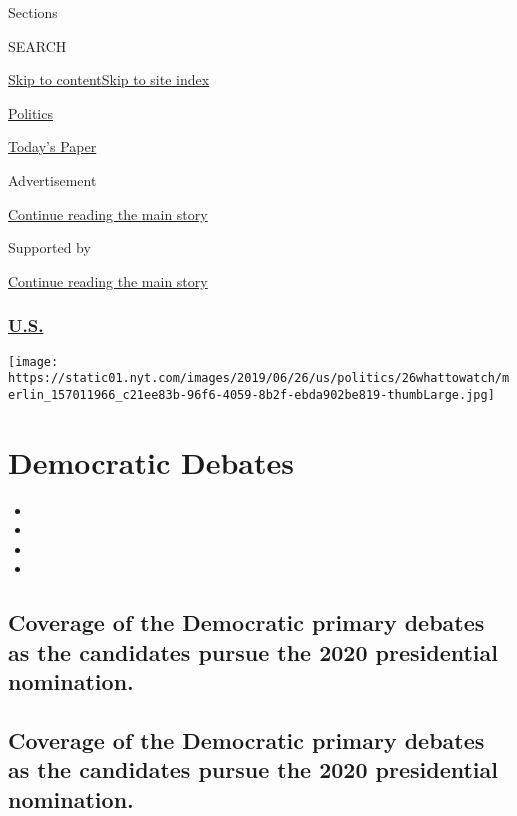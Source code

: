 Sections

SEARCH

\protect\hyperlink{site-content}{Skip to
content}\protect\hyperlink{site-index}{Skip to site index}

\href{https://www.nytimes.com/section/politics}{Politics}

\href{https://myaccount.nytimes.com/auth/login?response_type=cookie\&client_id=vi}{}

\href{https://www.nytimes.com/section/todayspaper}{Today's Paper}

Advertisement

\protect\hyperlink{after-top}{Continue reading the main story}

Supported by

\protect\hyperlink{after-sponsor}{Continue reading the main story}

\hypertarget{us}{%
\subsubsection{\texorpdfstring{\href{/section/us}{U.S.}}{U.S.}}\label{us}}

\texttt{[image: https://static01.nyt.com/images/2019/06/26/us/politics/26whattowatch/merlin\_157011966\_c21ee83b-96f6-4059-8b2f-ebda902be819-thumbLarge.jpg]}

\hypertarget{democratic-debates}{%
\section{Democratic Debates}\label{democratic-debates}}

\begin{itemize}
\item
\item
\item
\item
\end{itemize}

\hypertarget{coverage-of-the-democratic-primary-debates-as-the-candidates-pursue-the-2020-presidential-nomination}{%
\subsection{Coverage of the Democratic primary debates as the candidates
pursue the 2020 presidential
nomination.}\label{coverage-of-the-democratic-primary-debates-as-the-candidates-pursue-the-2020-presidential-nomination}}

\hypertarget{coverage-of-the-democratic-primary-debates-as-the-candidates-pursue-the-2020-presidential-nomination-1}{%
\subsection{Coverage of the Democratic primary debates as the candidates
pursue the 2020 presidential
nomination.}\label{coverage-of-the-democratic-primary-debates-as-the-candidates-pursue-the-2020-presidential-nomination-1}}

